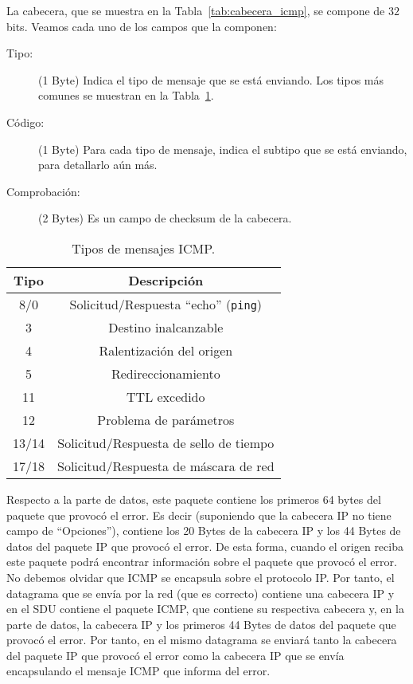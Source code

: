 La cabecera, que se muestra en la Tabla~\ref{tab:cabecera_icmp}, se compone de $32$ bits. Veamos cada uno de los campos que la componen:
\begin{description}
    \item[Tipo:] (1 Byte) Indica el tipo de mensaje que se está enviando. Los tipos más comunes se muestran en la Tabla~\ref{tab:tipos_icmp}.
    \item[Código:] (1 Byte) Para cada tipo de mensaje, indica el subtipo que se está enviando, para detallarlo aún más.
    \item[Comprobación:] (2 Bytes) Es un campo de checksum de la cabecera.
\end{description}
\begin{table}
\centering
    \begin{tabular}{|c|c|}
        \hline
        \textbf{Tipo} & \textbf{Descripción} \\ \hline
        8/0 & Solicitud/Respuesta ``echo'' (\verb|ping|) \\
        3 & Destino inalcanzable \\
        4 & Ralentización del origen \\
        5 & Redireccionamiento \\ 
        11 & \acrshort{TTL} excedido \\
        12 & Problema de parámetros \\
        13/14 & Solicitud/Respuesta de sello de tiempo\\
        17/18 & Solicitud/Respuesta de máscara de red\\ \hline
    \end{tabular}
    \caption{Tipos de mensajes \acrshort{ICMP}.}
    \label{tab:tipos_icmp}
\end{table}

Respecto a la parte de datos, este paquete contiene los primeros 64 bytes del paquete que provocó el error. Es decir (suponiendo que la cabecera \acrshort{IP} no tiene campo de ``Opciones''), contiene los 20 Bytes de la cabecera \acrshort{IP} y los 44 Bytes de datos del paquete \acrshort{IP} que provocó el error. De esta forma, cuando el origen reciba este paquete podrá encontrar información sobre el paquete que provocó el error.\\

No debemos olvidar que \acrshort{ICMP} se encapsula sobre el protocolo \acrshort{IP}. Por tanto, el datagrama que se envía por la red (que es correcto) contiene una cabecera \acrshort{IP} y en el \acrshort{SDU} contiene el paquete \acrshort{ICMP}, que contiene su respectiva cabecera y, en la parte de datos, la cabecera \acrshort{IP} y los primeros 44 Bytes de datos del paquete que provocó el error. Por tanto, en el mismo datagrama se enviará tanto la cabecera del paquete \acrshort{IP} que provocó el error como la cabecera \acrshort{IP} que se envía encapsulando el mensaje \acrshort{ICMP} que informa del error.\\

